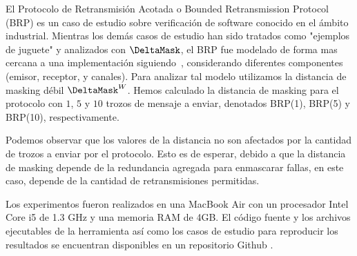 El Protocolo de Retransmisión Acotada o Bounded Retransmission Protocol (BRP) es un caso de estudio sobre verificación de software conocido en el ámbito industrial. Mientras los demás casos de estudio han sido tratados como "ejemplos de juguete" y analizados con $\DeltaMask$, el BRP fue modelado de forma mas cercana a una implementación siguiendo~\cite{GrooteP96}, considerando diferentes componentes (emisor, receptor, y canales). Para analizar tal modelo utilizamos la distancia de masking débil $\DeltaMask^W$.
Hemos calculado la distancia de masking para el protocolo con $1$, $5$ y $10$ trozos de mensaje a enviar, denotados BRP(1), BRP(5) y BRP(10), respectivamente. 

Podemos observar que los valores de la distancia no son afectados por la cantidad de trozos a enviar por el protocolo. Esto es de esperar, debido a que la distancia de masking depende de la redundancia agregada para enmascarar fallas, en este caso, depende de la cantidad de retransmisiones permitidas.

Los experimentos fueron realizados en una MacBook Air con un procesador Intel Core i5 de 1.3 GHz y una memoria RAM de 4GB. El código fuente y los archivos ejecutables de la herramienta así como los casos de estudio para reproducir los resultados se encuentran disponibles en un repositorio Github \cite{MaskD}.




